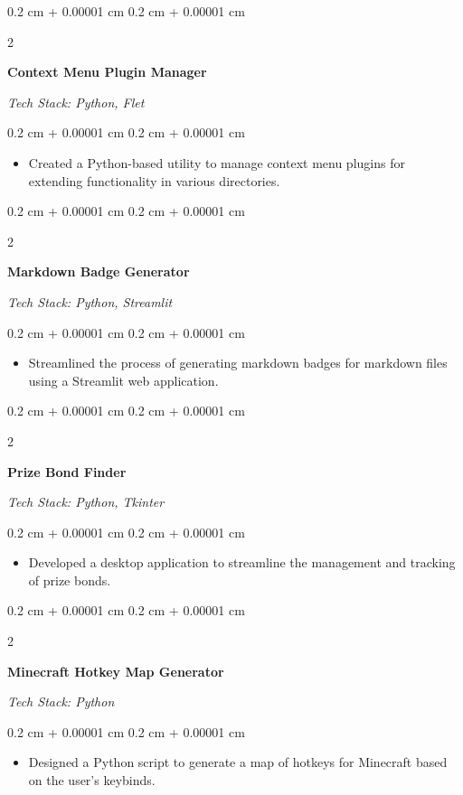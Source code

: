 \documentclass[10pt, a4paper]{article}
\newenvironment{highlights}{
    \begin{itemize}[
        topsep=0.1 cm,
        parsep=0.1 cm,
        partopsep=0pt,
        itemsep=0pt,
        leftmargin=0.4 cm + 10pt
    ]
}{
    \end{itemize}
} %
\newenvironment{onecolentry}{
    \begin{adjustwidth}{
        0.2 cm + 0.00001 cm
    }{
        0.2 cm + 0.00001 cm
    }
}{
    \end{adjustwidth}
} %
\newenvironment{twocolentry}[2][]{
    \onecolentry
    \def\secondColumn{#2}
    \begin{paracol}{2}
}{
    \switchcolumn \raggedleft \secondColumn
    \end{paracol}
    \endonecolentry
} %
\newcommand{\createpointblock}[5]{%
    \begin{twocolentry}{%
        \textit{#2}

        \textit{#4}}
        \textbf{#1}

        \textit{#3}
    \end{twocolentry}

    \vspace{0.1 cm}
    \begin{onecolentry}
        \begin{highlights}
            #5
        \end{highlights}
    \end{onecolentry}
}
\let\hrefWithoutArrow\href
\renewcommand{\href}[2]{\hrefWithoutArrow{#1}{\ifthenelse{\equal{#2}{}}{ }{#2 }\raisebox{.15ex}{\footnotesize \faExternalLink*}}}
\begin{document}
\vspace{0.2 cm}

\createpointblock{Context Menu Plugin Manager\href{https://github.com/abdbbdii/Context-Menu-Plugin-Manager}{}}{}
{Tech Stack: Python, Flet}{}
{%
	\item Created a Python-based utility to manage context menu plugins for extending functionality in various directories.
}

\vspace{0.2 cm}

\createpointblock{Markdown Badge Generator\href{https://github.com/abdbbdii/Markdown-badge-generator}{}}{}
{Tech Stack: Python, Streamlit}{}
{%
	\item Streamlined the process of generating markdown badges for markdown files using a Streamlit web application.
}

\vspace{0.2 cm}

\createpointblock{Prize Bond Finder\href{https://github.com/abdbbdii/prize-bond-finder}{}}{}
{Tech Stack: Python, Tkinter}{}
{%
	\item Developed a desktop application to streamline the management and tracking of prize bonds.
}





\vspace{0.2 cm}

\createpointblock{Minecraft Hotkey Map Generator\href{https://github.com/abdbbdii/minecraft-hotkey-map}{}}{}
{Tech Stack: Python}{}
{%
	\item Designed a Python script to generate a map of hotkeys for Minecraft based on the user's keybinds.
}
\end{document}
